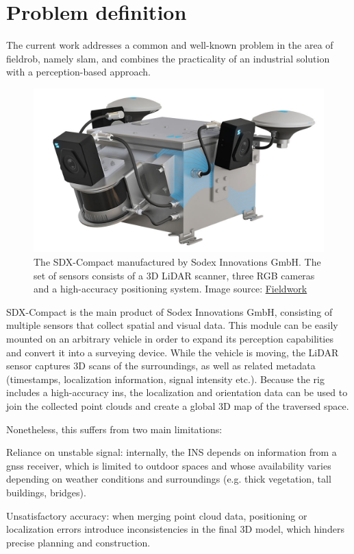 \section{Problem definition}

The current work addresses a common and well-known problem in the area of \gls{fieldrob}, namely \acrfull{slam}, and combines the practicality of an industrial solution with a perception-based approach.

\begin{figure}
    \centering
    \includegraphics[width=0.6\linewidth]{images/sdx-compact.jpg}
    \caption[SDX-Compact]{The SDX-Compact manufactured by Sodex Innovations GmbH. The set of sensors consists of a 3D LiDAR scanner, three RGB cameras and a high-accuracy positioning system. Image source: \href{https://fieldwork.ch/de/produkte/geopositioning/mobile-datenerfassung/sdx-compact}{Fieldwork}}
    \label{fig:sdx-compact}
\end{figure}

SDX-Compact  is the main product of Sodex Innovations GmbH, consisting of multiple sensors that collect spatial and visual data. This module can be easily mounted on an arbitrary vehicle in order to expand its perception capabilities and convert it into a \gls{surveying} device. While the vehicle is moving, the LiDAR sensor captures 3D scans of the surroundings, as well as related metadata (timestamps, localization information, signal intensity etc.). Because the rig includes a high-accuracy \acrfull{ins}, the localization and orientation data can be used to join the collected point clouds and create a global 3D map of the traversed space.

Nonetheless, this suffers from two main limitations:

\begin{compactitem}
    \item Reliance on unstable signal: internally, the INS depends on information from a \acrfull{gnss} receiver, which is limited to outdoor spaces and whose availability varies depending on weather conditions and surroundings (e.g. thick vegetation, tall buildings, bridges).
    \item Unsatisfactory accuracy: when merging point cloud data, positioning or localization errors introduce inconsistencies in the final 3D model, which hinders precise planning and construction.
\end{compactitem}


